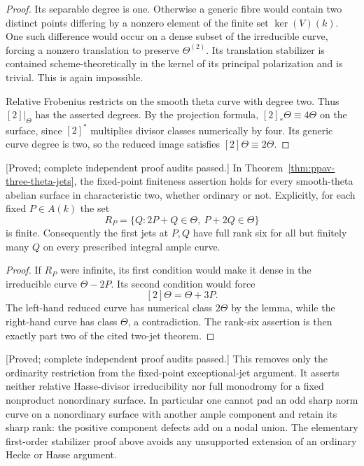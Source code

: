 \begin{proof}
Its separable degree is one. Otherwise a generic fibre
would contain two distinct points differing by a nonzero
element of the finite set $\ker(V)(k)$. One such difference
would occur on a dense subset of the irreducible curve,
forcing a nonzero translation to preserve
$\Theta^{(2)}$. Its translation stabilizer is contained
scheme-theoretically in the kernel of its principal
polarization and is trivial. This is again impossible.

Relative Frobenius restricts on the smooth theta curve
with degree two. Thus $[2]|_\Theta$ has the asserted
degrees. By the projection formula,
$[2]_*\Theta\equiv4\Theta$ on the surface, since
$[2]^*$ multiplies divisor classes numerically by four.
Its generic curve degree is two, so the reduced image
satisfies $[2]\Theta\equiv2\Theta$.
\end{proof}

\begin{corollary}
\label{cor:all-theta-fixed-point-jets-candidate}
\textup{[Proved; complete independent proof audits passed.]}
In Theorem~\ref{thm:ppav-three-theta-jets}, the fixed-point
finiteness assertion holds for every smooth-theta abelian
surface in characteristic two, whether ordinary or not.
Explicitly, for each fixed $P\in A(k)$ the set
\[
 R_P=\{Q:2P+Q\in\Theta,\ P+2Q\in\Theta\}
\]
is finite. Consequently the first jets at $P,Q$ have full
rank six for all but finitely many $Q$ on every prescribed
integral ample curve.
\end{corollary}
\begin{proof}
If $R_P$ were infinite, its first condition would make it
dense in the irreducible curve $\Theta-2P$. Its second
condition would force
\[
                          [2]\Theta=\Theta+3P.
\]
The left-hand reduced curve has numerical class $2\Theta$
by the lemma, while the right-hand curve has class
$\Theta$, a contradiction. The rank-six assertion is
then exactly part two of the cited two-jet theorem.
\end{proof}

\begin{remark}[Scope]
\label{rem:all-theta-fixed-point-jets-scope-candidate}
\textup{[Proved; complete independent proof audits passed.]}
This removes only the ordinarity restriction from the
fixed-point exceptional-jet argument. It asserts neither
relative Hasse-divisor irreducibility nor full monodromy
for a fixed nonproduct nonordinary surface. In particular
one cannot pad an odd sharp norm curve on a nonordinary
surface with another ample component and retain its sharp
rank: the positive component defects add on a nodal union.
The elementary first-order stabilizer proof above avoids
any unsupported extension of an ordinary Hecke or Hasse
argument.
\end{remark}


